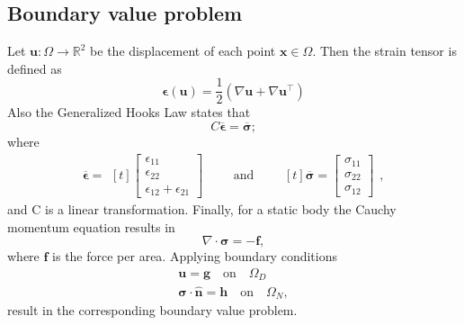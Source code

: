 \documentclass[5pt,a4paper,english]{elsarticle}%
\begin{document}
\subsection{Boundary value problem}
Let $\boldsymbol{u} : \Omega \rightarrow \mathbb{R}^2$ be the displacement of each point $\boldsymbol{x} \in \Omega$. Then the strain tensor is defined as 
\begin{equation} \label{eq-strain-tensor}
    \boldsymbol{\epsilon}(\boldsymbol{u}) = \frac{1}{2}(\nabla \boldsymbol{u} + \nabla \boldsymbol{u}^\intercal)
\end{equation}
Also the Generalized Hooks Law states that
\begin{equation}
    C \boldsymbol{\overline{\epsilon}}  = \boldsymbol{\overline{\sigma}};
    \label{hooks-law}
\end{equation}
where 
\begin{equation*}
    \boldsymbol{\overline{\epsilon}} =\begin{aligned}[t]
    \begin{bmatrix}
        \epsilon_{1 1} \\
        \epsilon_{2 2} \\
        \epsilon_{1 2} + \epsilon_{2 1}
    \end{bmatrix}
    \end{aligned}
    \qquad \text{and} \qquad
    \begin{aligned}[t]
        \boldsymbol{\overline{\sigma}} = \begin{bmatrix}
            \sigma_{1 1} \\
            \sigma_{2 2} \\
            \sigma_{1 2} 
        \end{bmatrix}
    \end{aligned},
\end{equation*}
and C is a linear transformation.
Finally, for a static body the Cauchy momentum equation results in 
\begin{equation} \label{eq-cauchy-momentum}
    \nabla \cdot \boldsymbol{\sigma} = -\boldsymbol{f},
\end{equation}
where $\boldsymbol{f}$ is the force per area. Applying boundary conditions 
\begin{align}
    \boldsymbol{u}  = \boldsymbol{g} \quad \text{on} \quad \Omega_D   \\
    \boldsymbol{\sigma} \cdot \boldsymbol{\hat{n}}  =  \boldsymbol{h} \quad \text{on} \quad \Omega_N,
    \label{elasticity-bc}
\end{align}
result in the corresponding boundary value problem. 
\end{document}
